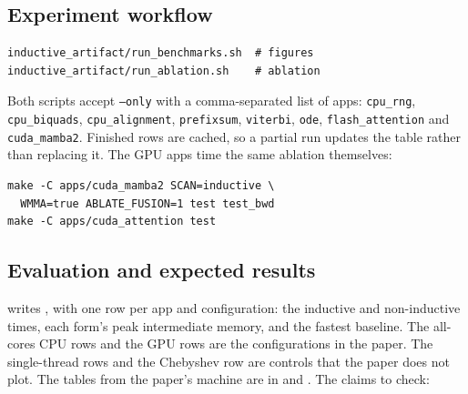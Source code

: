\subsection{Experiment workflow}

{\footnotesize
\begin{verbatim}
inductive_artifact/run_benchmarks.sh  # figures
inductive_artifact/run_ablation.sh    # ablation
\end{verbatim}
}

\noindent Both scripts accept \texttt{--only} with a comma-separated list of
apps: \texttt{cpu\_rng}, \texttt{cpu\_biquads}, \texttt{cpu\_alignment},
\texttt{prefixsum}, \texttt{viterbi}, \texttt{ode}, \texttt{flash\_attention}
and \texttt{cuda\_mamba2}. Finished rows are cached, so a partial run
updates the table rather than replacing it. The GPU apps time the same
ablation themselves:

{\footnotesize
\begin{verbatim}
make -C apps/cuda_mamba2 SCAN=inductive \
  WMMA=true ABLATE_FUSION=1 test test_bwd
make -C apps/cuda_attention test
\end{verbatim}
}

\subsection{Evaluation and expected results}

 writes ,
with one row per app and configuration: the inductive and non-inductive
times, each form's peak intermediate memory, and the fastest baseline. The
all-cores CPU rows and the GPU rows are the configurations in the paper. The
single-thread rows and the Chebyshev row are controls that the paper does
not plot. The tables from the paper's machine are in
 and
. The claims to check:

